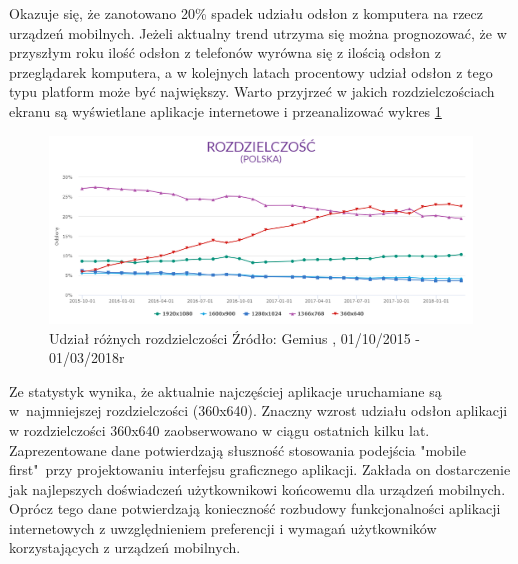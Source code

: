 \documentclass[a4paper,12pt,twoside,openany]{report}
\begin{document}
Okazuje się, że zanotowano 20\% spadek udziału odsłon z komputera na rzecz urządzeń mobilnych. Jeżeli aktualny trend utrzyma się można prognozować, że w przyszłym roku ilo\'sć odsłon z telefonów wyrówna się z ilo\'scią odsłon z przeglądarek komputera, a w kolejnych latach procentowy udział odsłon z tego typu platform może być największy. \newline
Warto przyjrzeć w jakich rozdzielczo\'sciach ekranu są wy\'swietlane aplikacje internetowe i przeanalizować wykres \ref{fig:plot2}  
\begin{figure}[h]
    \centering
    \includegraphics[width=1\textwidth]{rys/Rozdzielczosc.png}
    \caption{Udział różnych rozdzielczo\'sci  \newline Źródło: Gemius \cite{resolution}, 01/10/2015 - 01/03/2018r}
    \label{fig:plot2}
\end{figure}

Ze statystyk wynika, że aktualnie najczę\'sciej aplikacje uruchamiane są w~najmniejszej rozdzielczo\'sci (360x640). Znaczny wzrost udziału odsłon aplikacji w rozdzielczo\'sci 360x640 zaobserwowano w ciągu ostatnich kilku lat. \newline 
Zaprezentowane dane potwierdzają słuszno\'sć stosowania podej\'scia "mobile first"~przy projektowaniu interfejsu graficznego aplikacji. Zakłada on dostarczenie jak najlepszych do\'swiadczeń użytkownikowi końcowemu dla urządzeń mobilnych. Oprócz tego dane potwierdzają konieczno\'sć rozbudowy funkcjonalno\'sci aplikacji internetowych z uwzględnieniem preferencji i wymagań użytkowników korzystających z urządzeń mobilnych.
\end{document}

